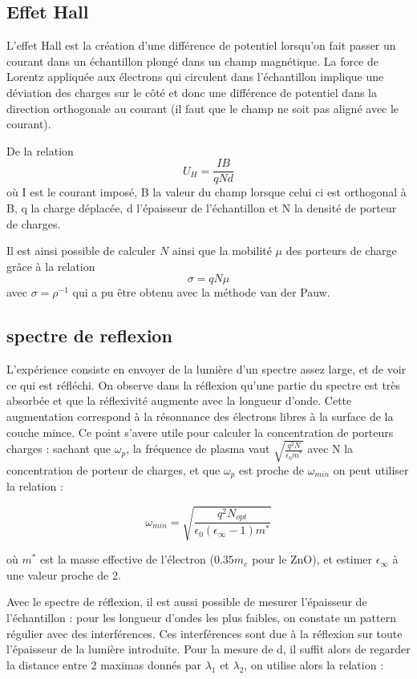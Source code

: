 \documentclass[a4paper,12pt,oneside]{article}
\def \be {\begin{equation}}
\def \ee {\end{equation}}
\begin{document}
\subsection{Effet Hall}
	L'effet Hall est la création d'une différence de potentiel lorsqu'on fait passer un courant dans un échantillon plongé dans un champ magnétique. La force de Lorentz appliquée aux électrons qui circulent dans l'échantillon implique une déviation des charges sur le côté et donc une différence de potentiel dans la direction orthogonale au courant (il faut que le champ ne soit pas aligné avec le courant).

	De la relation
	\be
		U_H = \frac{IB}{qNd}
	\ee
	où I est le courant imposé, B la valeur du champ lorsque celui ci est orthogonal à B, q la charge déplacée, d l'épaisseur de l'échantillon et N la densité de porteur de charges.

	Il est ainsi possible de calculer $N$ ainsi que la mobilité $\mu$ des porteurs de charge grâce à la relation
	\be
		\sigma = q N \mu
	\ee
	avec $\sigma=\rho^{-1}$ qui a pu être obtenu avec la méthode van der Pauw.

\subsection{spectre de reflexion}
L'expérience consiste en envoyer de la lumière d'un spectre assez large, et de voir ce qui est réfléchi. On observe dans la réflexion qu'une partie du spectre est très absorbée et que la réflexivité augmente avec la longueur d'onde. Cette augmentation correspond à la résonnance des électrons libres à la surface de la couche mince. Ce point s'avere utile pour calculer la concentration de porteurs charges : sachant que $\omega_p$, la fréquence de plasma vaut $\sqrt{\frac{q^2N}{\epsilon_0 m^*}}$ avec N la concentration de porteur de charges, et que $\omega_p$ est proche de $\omega_{min}$ on peut utiliser la relation :

\be
	\omega_{min}=\sqrt{ \frac{q^2 N_{opt}} {\epsilon_0(\epsilon_\infty-1)m^*} }
\ee

où $m^*$ est la masse effective de l'électron ($0.35 m_e$ pour le ZnO), et estimer $\epsilon_\infty$ à une valeur proche de 2.





Avec le spectre de réflexion, il est aussi possible de mesurer l'épaisseur de l'échantillon : pour les longueur d'ondes les plus faibles, on constate un pattern régulier avec des interférences. Ces interférences sont due à la réflexion sur toute l'épaisseur de la lumière introduite. Pour la mesure de d, il suffit alors de regarder la distance entre 2 maximas donnés par $\lambda_1$ et $\lambda_2$, on utilise alors la relation :
\end{document}
